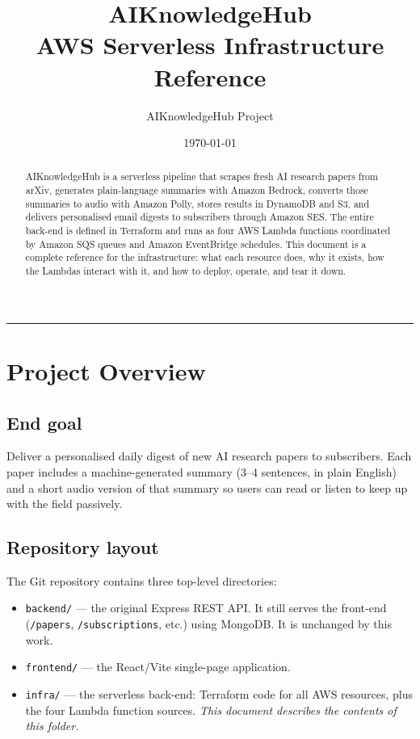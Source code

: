 \documentclass[11pt,a4paper]{article}
\title{\textbf{AIKnowledgeHub}\\[4pt]\large AWS Serverless Infrastructure Reference}
\author{AIKnowledgeHub Project}
\date{\today}
\begin{document}
\maketitle

\begin{abstract}
\noindent
AIKnowledgeHub is a serverless pipeline that scrapes fresh AI research papers from arXiv, generates plain-language summaries with Amazon Bedrock, converts those summaries to audio with Amazon Polly, stores results in DynamoDB and S3, and delivers personalised email digests to subscribers through Amazon SES. The entire back-end is defined in Terraform and runs as four AWS Lambda functions coordinated by Amazon SQS queues and Amazon EventBridge schedules. This document is a complete reference for the infrastructure: what each resource does, why it exists, how the Lambdas interact with it, and how to deploy, operate, and tear it down.
\end{abstract}

\tableofcontents
\vspace{1em}
\hrule

\section{Project Overview}

\subsection{End goal}
Deliver a personalised daily digest of new AI research papers to subscribers. Each paper includes a machine-generated summary (3--4 sentences, in plain English) and a short audio version of that summary so users can read or listen to keep up with the field passively.

\subsection{Repository layout}
The Git repository contains three top-level directories:

\begin{itemize}[leftmargin=*]
  \item \texttt{backend/} --- the original Express REST API. It still serves the front-end (\texttt{/papers}, \texttt{/subscriptions}, etc.) using MongoDB. It is unchanged by this work.
  \item \texttt{frontend/} --- the React/Vite single-page application.
  \item \texttt{infra/} --- the serverless back-end: Terraform code for all AWS resources, plus the four Lambda function sources. \textit{This document describes the contents of this folder.}
\end{itemize}
\end{document}
